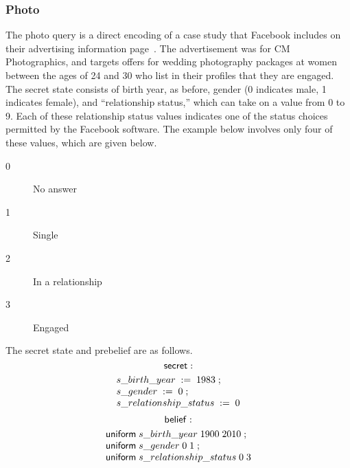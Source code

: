 \subsubsection{Photo}

The photo query is a direct encoding of a case study that Facebook
includes on their advertising information
page~\cite{wedding-case-study}.  The advertisement was for CM
Photographics, and targets offers for wedding photography packages at
women between the ages of 24 and 30 who list in their profiles that
they are engaged.  The secret state consists of birth year, as before,
gender (0 indicates male, 1 indicates female), and ``relationship
status,'' which can take on a value from 0 to 9.  Each of these
relationship status values indicates one of the status choices
permitted by the Facebook software.  The example below involves only
four of these values, which are given below.
\begin{description}
\item[0] No answer
\item[1] Single
\item[2] In a relationship
\item[3] Engaged
\end{description}
The secret state and prebelief are as follows.
$$ \mathsf{secret}: $$
\begin{displaymath}{\small
\begin{array}{l}
  \sassign{s\text{\_}birth\text{\_}year}{1983}\; ;\\
  \sassign{s\text{\_}gender}{0}\; ;\\
  \sassign{s\text{\_}relationship\text{\_}status}{0}\\
\end{array}
}
\end{displaymath}
$$ \mathsf{belief}: $$
\begin{displaymath}{\small
\begin{array}{l}
  \suniform{s\text{\_}birth\text{\_}year}{1900}{2010}\; ;\\
  \suniform{s\text{\_}gender}{0}{1}\; ;\\
  \suniform{s\text{\_}relationship\text{\_}status}{0}{3}\\
\end{array}
}
\end{displaymath}

